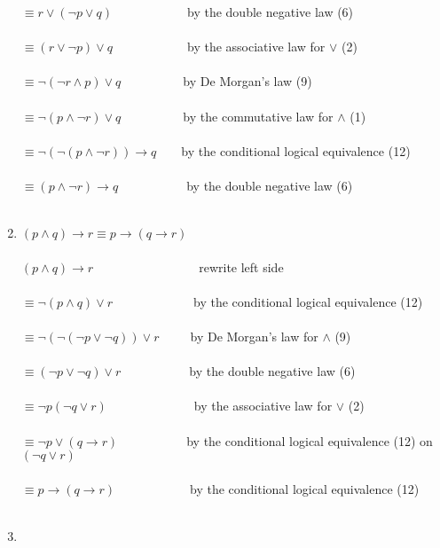 \documentclass[a4paper,11pt]{article}
\begin{document}
\begin{enumerate}
        $\equiv r \vee (\neg p \vee q)$~~~~~~~~~~~~by the double negative law (6)\\\\
        $\equiv (r \vee \neg p) \vee q$~~~~~~~~~~~~by the associative law for $\vee$ (2)\\\\
        $\equiv \neg (\neg r \wedge p) \vee q$~~~~~~~~~~by De Morgan's law (9)\\\\
        $\equiv \neg (p \wedge \neg r) \vee q$~~~~~~~~~~by the commutative law for $\wedge$ (1)\\\\
        $\equiv \neg(\neg(p \wedge \neg r)) \rightarrow q$~~~~by the conditional logical equivalence (12)\\\\
        $\equiv (p \wedge \neg r) \rightarrow q$~~~~~~~~~~~by the double negative law (6)\\\\
    \item %
        $(p \wedge q) \rightarrow r \equiv p \rightarrow (q \rightarrow r)$\\\\
        $(p \wedge q) \rightarrow r$~~~~~~~~~~~~~~~~~rewrite left side\\\\
        $\equiv \neg(p \wedge q) \vee r$~~~~~~~~~~~~~by the conditional logical equivalence (12)\\\\
        $\equiv \neg(\neg(\neg p \vee \neg q)) \vee r$~~~~~by De Morgan's law for $\wedge$ (9)\\\\
        $\equiv (\neg p \vee \neg q) \vee r$~~~~~~~~~~~by the double negative law (6)\\\\
        $\equiv \neg p (\neg q \vee r)$~~~~~~~~~~~~~~by the associative law for $\vee$ (2)\\\\
        $\equiv \neg p \vee (q \rightarrow r)$~~~~~~~~~~~by the conditional logical equivalence (12) on $(\neg q \vee r)$\\\\
        $\equiv p \rightarrow (q \rightarrow r)$~~~~~~~~~~~~by the conditional logical equivalence (12)\\\\
    \item %

\end{enumerate}
\end{document}
